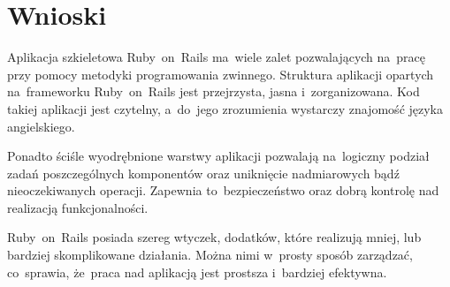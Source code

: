 \section{Wnioski}

Aplikacja szkieletowa Ruby~on~Rails ma~wiele zalet pozwalających na~pracę przy pomocy metodyki programowania zwinnego. Struktura aplikacji opartych na~frameworku Ruby~on~Rails jest przejrzysta, jasna i~zorganizowana. Kod takiej aplikacji jest czytelny, a~do~jego zrozumienia wystarczy znajomość języka angielskiego.


Ponadto ściśle wyodrębnione warstwy aplikacji pozwalają na~logiczny podział zadań poszczególnych komponentów oraz uniknięcie nadmiarowych bądź nieoczekiwanych operacji. Zapewnia to~bezpieczeństwo oraz dobrą kontrolę nad realizacją funkcjonalności.


Ruby~on~Rails posiada szereg wtyczek, dodatków, które realizują mniej, lub bardziej skomplikowane działania. Można nimi w~prosty sposób zarządzać, co~sprawia, że~praca nad aplikacją jest prostsza i~bardziej efektywna.
